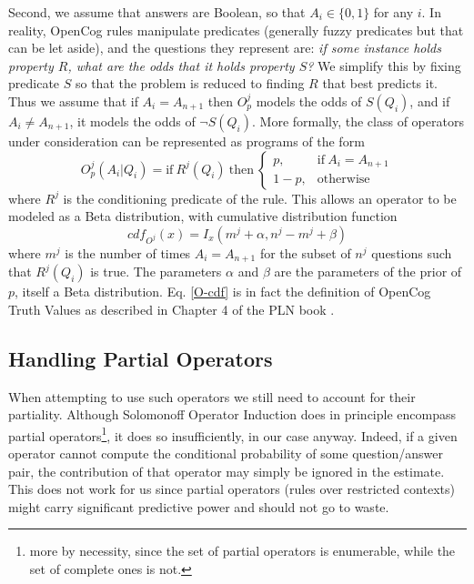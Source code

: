 \documentclass[runningheads]{llncs}
\begin{document}
Second, we assume that answers are Boolean, so that $A_i\in \{0, 1\}$
for any $i$. In reality, OpenCog rules manipulate predicates
(generally fuzzy predicates but that can be let aside), and the
questions they represent are: {\it if some instance holds property
  $R$, what are the odds that it holds property $S$?} We simplify this
by fixing predicate $S$ so that the problem is reduced to finding $R$
that best predicts it. Thus we assume that if $A_i=A_{n+1}$ then
$O^j_p$ models the odds of $S(Q_i)$, and if $A_i \neq A_{n+1}$, it
models the odds of $\neg S(Q_i)$. More formally, the class of
operators under consideration can be represented as programs of the
form
\begin{equation}
O^j_p(A_i|Q_i) = \text{if}\ R^j(Q_i)\ \text{then}\
\begin{cases}
  p, & \text{if}\ A_i = A_{n+1}\\
  1-p, & \text{otherwise}
\end{cases}
\end{equation}
where $R^j$ is the conditioning predicate of the rule. This allows an
operator to be modeled as a Beta distribution, with cumulative
distribution function
\begin{equation}
  \label{O-cdf}
  cdf_{O^j}(x) = I_x(m^j + \alpha, n^j-m^j+\beta)
\end{equation}
where $m^j$ is the number of times $A_i = A_{n+1}$ for the subset of
$n^j$ questions such that $R^j(Q_i)$ is true. The parameters $\alpha$
and $\beta$ are the parameters of the prior of $p$, itself a Beta
distribution. Eq. \ref{O-cdf} is in fact the definition of OpenCog
Truth Values as described in Chapter 4 of the PLN book
\cite{Goertzel09PLN}.

\subsection{Handling Partial Operators}
\label{ha-pa-op}
When attempting to use such operators we still need to account for
their partiality. Although Solomonoff Operator Induction does in
principle encompass partial operators\footnote{more by necessity,
  since the set of partial operators is enumerable, while the set of
  complete ones is not.}, it does so insufficiently, in our case
anyway. Indeed, if a given operator cannot compute the conditional
probability of some question/answer pair, the contribution of that
operator may simply be ignored in the estimate. This does not work for
us since partial operators (rules over restricted contexts) might
carry significant predictive power and should not go to waste.
\end{document}

